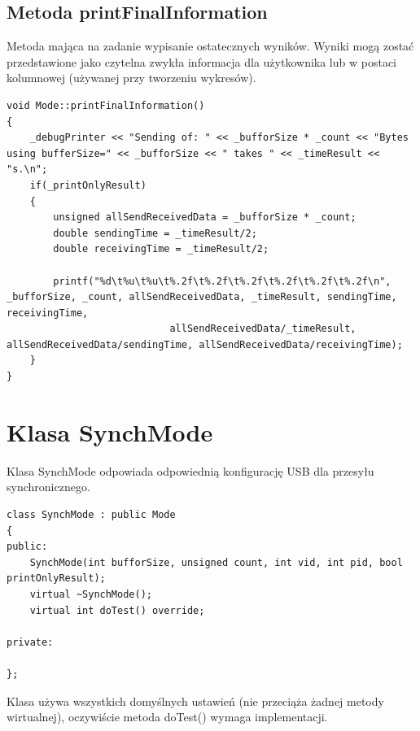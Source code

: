 \documentclass{BscUS}
\begin{document}
\subsection{Metoda printFinalInformation}
Metoda mająca na zadanie wypisanie ostatecznych wyników. Wyniki mogą zostać przedstawione jako czytelna zwykła informacja dla użytkownika lub w postaci kolumnowej (używanej przy tworzeniu wykresów).
\begin{lstlisting}[caption={Metoda Mode::printFinalInformation()},label={lst:Mode_printFinalInformation}]
void Mode::printFinalInformation()
{
	_debugPrinter << "Sending of: " << _bufforSize * _count << "Bytes using bufferSize=" << _bufforSize << " takes " << _timeResult << "s.\n";
	if(_printOnlyResult)
	{
		unsigned allSendReceivedData = _bufforSize * _count;
		double sendingTime = _timeResult/2;
		double receivingTime = _timeResult/2;

		printf("%d\t%u\t%u\t%.2f\t%.2f\t%.2f\t%.2f\t%.2f\t%.2f\n", _bufforSize, _count, allSendReceivedData, _timeResult, sendingTime, receivingTime,
							allSendReceivedData/_timeResult, allSendReceivedData/sendingTime, allSendReceivedData/receivingTime);
	}
}
\end{lstlisting}
\section{Klasa SynchMode}
Klasa SynchMode odpowiada odpowiednią konfigurację USB dla przesyłu synchronicznego. 

\begin{lstlisting}[caption={Deklaracja klasy SynchMode},label={lst:CSynchMode}]
class SynchMode : public Mode
{
public:
	SynchMode(int bufforSize, unsigned count, int vid, int pid, bool printOnlyResult);
	virtual ~SynchMode();
	virtual int doTest() override;

private:

};
\end{lstlisting}
Klasa używa wszystkich domyślnych ustawień (nie przeciąża żadnej metody wirtualnej), oczywiście metoda doTest() wymaga implementacji.
\end{document}
